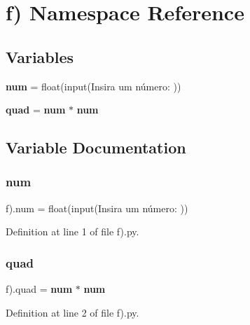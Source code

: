 \section{f) Namespace Reference}
\label{namespacef_08}
\subsection*{Variables}
\begin{DoxyCompactItemize}
\item 
\textbf{ num} = float(input(\textquotesingle{}Insira um número\+: \textquotesingle{}))
\item 
\textbf{ quad} = \textbf{ num} $\ast$ \textbf{ num}
\end{DoxyCompactItemize}


\subsection{Variable Documentation}
\mbox{\label{namespacef_08_a7cb5dc8ad6ffefc472e7850ad55668a9}} 
\subsubsection{num}
{\footnotesize\ttfamily f).num = float(input(\textquotesingle{}Insira um número\+: \textquotesingle{}))}



Definition at line 1 of file f).\+py.

\mbox{\label{namespacef_08_a6695e2405e0834383348818e66308715}} 
\subsubsection{quad}
{\footnotesize\ttfamily f).quad = \textbf{ num} $\ast$ \textbf{ num}}



Definition at line 2 of file f).\+py.


